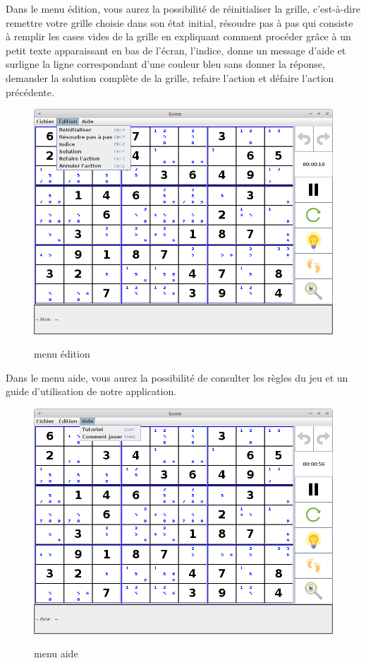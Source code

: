 \newpage
Dans le menu édition, vous aurez la possibilité de réinitialiser la grille, 
c'est-à-dire remettre votre grille choisie dans son état initial, 
résoudre pas à pas qui consiste à remplir les cases vides de la grille
en expliquant comment procéder grâce à un petit texte apparaissant en bas de l'écran, 
l'indice, donne un message d'aide et surligne la ligne correspondant d'une couleur bleu 
sans donner la réponse, demander la solution complète de la grille, 
refaire l'action et défaire l'action précédente.

\begin{figure}[ht]
  \caption{\label{annexe8} menu édition}
  \includegraphics [width=130mm]{images/edition.png} \\[0.5cm]
\end{figure}

\newpage
Dans le menu aide, vous aurez la possibilité de consulter 
les règles du jeu et un guide d'utilisation de notre application.

\begin{figure}[ht]
  \caption{\label{annexe9} menu aide}
  \includegraphics [width=130mm]{images/aide.png} \\[0.5cm]
\end{figure}

